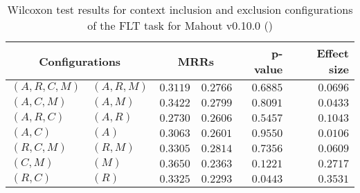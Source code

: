 
\begin{table}
\begin{spacing}{1.2}
\centering
\caption{Wilcoxon test results for context inclusion and exclusion configurations of the FLT task for Mahout v0.10.0 (\ctwo)}
\label{table:versus-wilcox-mahout-flt-context}
\begin{tabular}{ll|rr|rr}
\toprule
      \multicolumn{2}{c|}{Configurations} &                \multicolumn{2}{c|}{MRRs} &        p-value & Effect size \\
\midrule
 $(A,R,C,M)$ &  $(A,R,M)$ &  $\bm{0.3119}$ &  $0.2766$ & $0.6885$ &    $0.0696$ \\
   $(A,C,M)$ &    $(A,M)$ &  $\bm{0.3422}$ &  $0.2799$ & $0.8091$ &    $0.0433$ \\
   $(A,R,C)$ &    $(A,R)$ &  $\bm{0.2730}$ &  $0.2606$ & $0.5457$ &    $0.1043$ \\
     $(A,C)$ &      $(A)$ &  $\bm{0.3063}$ &  $0.2601$ & $0.9550$ &    $0.0106$ \\
   $(R,C,M)$ &    $(R,M)$ &  $\bm{0.3305}$ &  $0.2814$ & $0.7356$ &    $0.0609$ \\
     $(C,M)$ &      $(M)$ &  $\bm{0.3650}$ &  $0.2363$ & $0.1221$ &    $0.2717$ \\
     $(R,C)$ &      $(R)$ &  $\bm{0.3325}$ &  $0.2293$ & $0.0443$ &    $0.3531$ \\
\bottomrule
\end{tabular}

\end{spacing}
\end{table}

